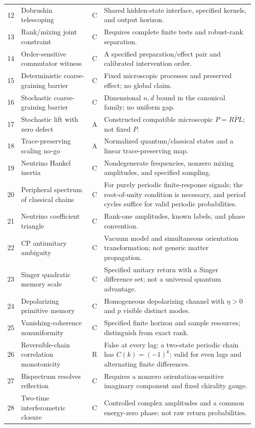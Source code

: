 \documentclass[11pt,a4paper,oneside]{book}
\begin{document}
\begin{longtable}{p{}p{}p{}p{}}
12&Dobrushin telescoping&C&Shared hidden-state interface, specified kernels, and output horizon.\\
13&Rank/mixing joint constraint&C&Requires complete finite tests and robust-rank separation.\\
14&Order-sensitive commutator witness&C&A specified preparation/effect pair and calibrated intervention order.\\
15&Deterministic coarse-graining barrier&C&Fixed microscopic processes and preserved effect; no global claim.\\
16&Stochastic coarse-graining barrier&C&Dimensional $n,d$ bound in the canonical family; no uniform gap.\\
17&Stochastic lift with zero defect&A&Constructed compatible microscopic $P=R\bar P L$; not fixed $P$.\\
18&Trace-preserving scaling no-go&A&Normalized quantum/classical states and a linear trace-preserving map.\\
19&Neutrino Hankel inertia&C&Nondegenerate frequencies, nonzero mixing amplitudes, and specified sampling.\\
20&Peripheral spectrum of classical chains&C&For purely periodic finite-response signals; the root-of-unity condition is necessary, and period cycles suffice for valid periodic probabilities.\\
21&Neutrino coefficient triangle&C&Rank-one amplitudes, known labels, and phase convention.\\
22&CP antiunitary ambiguity&C&Vacuum model and simultaneous orientation transformation; not generic matter propagation.\\
23&Singer quadratic memory scale&C&Specified unitary return with a Singer difference set; not a universal quantum advantage.\\
24&Depolarizing primitive memory&C&Homogeneous depolarizing channel with $\eta>0$ and $p$ visible distinct modes.\\
25&Vanishing-coherence nonuniformity&C&Specified finite horizon and sample resources; distinguish from exact rank.\\
26&Reversible-chain correlation monotonicity&R&False at every lag: a two-state periodic chain has $C(k)=(-1)^k$; valid for even lags and alternating finite differences.\\
27&Bispectrum resolves reflection&C&Requires a nonzero orientation-sensitive imaginary component and fixed chirality gauge.\\
28&Two-time interferometric closure&C&Controlled complex amplitudes and a common energy-zero phase; not raw return probabilities.\\

\end{longtable}
\end{document}
